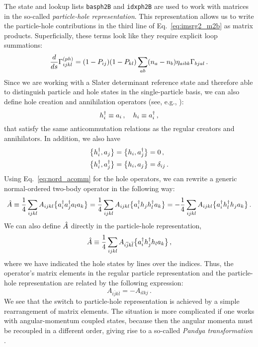 The state and lookup lists \texttt{basph2B} and \texttt{idxph2B} are used
to work with matrices in the so-called \emph{particle-hole representation}. 
This representation allows us to write the particle-hole contributions in
the third line of Eq.~\eqref{eq:imsrg2_m2b} as matrix products. Superficially,
these terms look like they require explicit loop summations:
\begin{equation}\label{eq:imsrg2_m2b_ph}
  \totd{}{s}\Gamma^{(ph)}_{ijkl}=(1-P_{ij})(1-P_{kl})\sum_{ab}(n_a-n_b)\eta_{aibk}\Gamma_{bjal}\,.
\end{equation}
Since we are working with a Slater determinant reference state and therefore
able to distinguish particle and hole states in the single-particle basis,
we can also define hole creation and annihilation operators (see, e.g., \cite{Suhonen:2007wo}):
\begin{equation}
  h^\dag_i \equiv a_i\,,\quad h_i \equiv a^\dag_i\,, 
\end{equation}
that satisfy the same anticommutation relations as the regular creators
and annihilators. In addition, we also have
\begin{align}
   \big\{ {h^\dag_i}, {a_j} \big\}   &=  \big\{ {h_i}, {a^\dag_j} \big\}  = 0\,,\notag\\
   \big\{ {h^\dag_i}, {a^\dag_j} \big\}  &=  \big\{ {h_i}, {a_j} \big\}  = \delta_{ij}\,.
\end{align}
Using Eq.~\eqref{eq:nord_acomm} for the hole operators, we can rewrite a 
generic normal-ordered two-body operator in the following way:
\begin{equation}
  \hat{A} \equiv \frac{1}{4}\sum_{ijkl}A_{ijkl}\big\{a^\dag_{i}a^\dag_{j}a_{l}a_{k}\big\}
    = \frac{1}{4}\sum_{ijkl}A_{ijkl}\big\{a^\dag_{i}h_{j}h^\dag_{l}a_{k}\big\}
    = -\frac{1}{4}\sum_{ijkl}A_{ijkl}\big\{a^\dag_{i}h^\dag_{l}h_{j}a_{k}\big\}\,.
\end{equation}
We can also define $\hat{A}$ directly in the particle-hole representation, 
\begin{equation}
   \hat{A} \equiv \frac{1}{4}\sum_{ijkl}A_{i\overline{j}k\overline{l}}\big\{a^\dag_{i}h^\dag_{j}h_{l}a_{k}\big\}\,,
\end{equation}
where we have indicated the hole states by lines over the indices. Thus,
the operator's matrix elements in the regular particle representation and 
the particle-hole representation are related by the following expression:
\begin{equation}
  A_{i\overline{j}k\overline{l}} = - A_{ilkj}\,.
\end{equation}
We see that the switch to particle-hole representation is achieved 
by a simple rearrangement of matrix elements. The situation is more 
complicated if one works with angular-momentum coupled states, because 
then the angular momenta must be recoupled in a different order, giving 
rise to a so-called \emph{Pandya transformation} 
\cite{Pandya:1956zv,Suhonen:2007wo,Kuo:1981fk}. 

